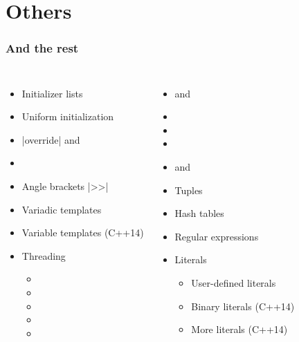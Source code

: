 \documentclass[aspectratio=1610]{beamer}
\begin{document}
\section{Others}

\begin{frame}[fragile]
  \frametitle{And the rest}
  \begin{columns}
    \begin{itemize}
    \item Initializer lists
    \item Uniform initialization
    \item \cpp|override| and 
    \item {}
    \item Angle brackets \cpp|>>|
    \item Variadic templates
    \item Variable templates (C++14)
    \item Threading
      \begin{itemize}
      \item {}
      \item {}
      \item {}
      \item {}
      \item {}
      \end{itemize}
    \end{itemize}
    \begin{itemize}
    \item {} and 
    \item {}
    \item {}
    \item {}
    \item {} and 
    \item Tuples
    \item Hash tables
    \item Regular expressions
    \item Literals
      \begin{itemize}
      \item User-defined literals
      \item Binary literals (C++14)
      \item More literals (C++14)
      \end{itemize}
    \end{itemize}
  \end{columns}
\end{frame}
\end{document}
